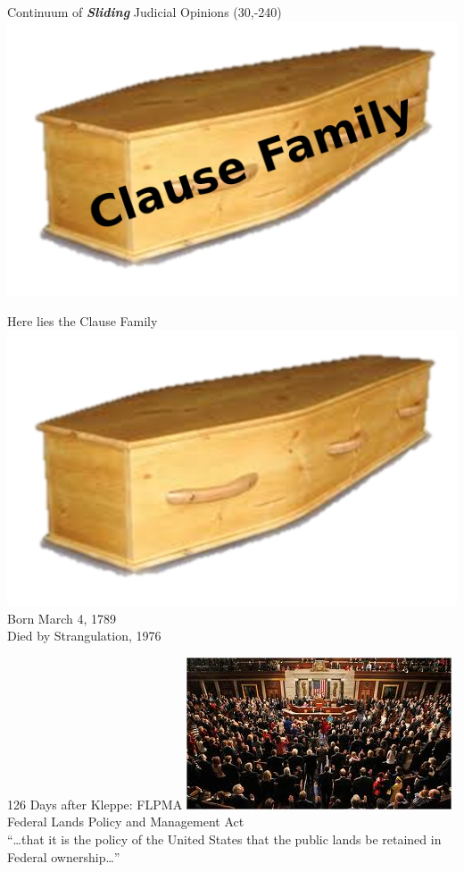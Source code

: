 \begin{frame}{Continuum of \textbf{\emph{Sliding}} Judicial Opinions}
    \pause
    \Put(30,-240){\includegraphics[width=.5\textwidth]{img/coffin-clause.png}}
\end{frame}

\begin{frame}{Here lies the Clause Family}
    \centering
    \includegraphics[width=.6\textwidth]{img/coffin.png} \\
    { \large
    Born March 4, 1789 \\
    Died by Strangulation, 1976 \\
    }
\end{frame}

\begin{frame}{126 Days after Kleppe: FLPMA}
    \centering
    \includegraphics[width=.8\textwidth]{img/congress.png} \\
    Federal Lands Policy and Management Act \\
    { \large ``\ldots that it is the policy of the United States that the
    public lands be retained in Federal ownership\ldots'' }
\end{frame}

